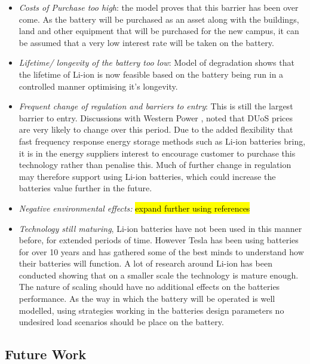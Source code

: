 \begin{itemize}
\tightlist
\item
  \emph{Costs of Purchase too high}: the model proves that this barrier
  has been over come. As the battery will be purchased as an asset along
  with the buildings, land and other equipment that will be purchased
  for the new campus, it can be assumed that a very low interest rate
  will be taken on the battery.
\item
  \emph{Lifetime/ longevity of the battery too low}: Model of
  degradation shows that the lifetime of Li-ion is now feasible based on
  the battery being run in a controlled manner optimising it's
  longevity.
\item
  \emph{Frequent change of regulation and barriers to entry}: This is
  still the largest barrier to entry. Discussions with Western Power
  \cite{wpMWMD}, noted that DUoS prices are very likely to change over
  this period. Due to the added flexibility that fast frequency response
  energy storage methods such as Li-ion batteries bring, it is in the
  energy suppliers interest to encourage customer to purchase this
  technology rather than penalise this. Much of further change in
  regulation may therefore support using Li-ion batteries, which could
  increase the batteries value further in the future.
\item
  \emph{Negative environmental effects:}
  \hl{expand further using references } \cite{daniels2013financial}
\item
  \emph{Technology still maturing}, Li-ion batteries have not been used
  in this manner before, for extended periods of time. However Tesla has
  been using batteries for over 10 years and has gathered some of the
  best minds to understand how their batteries will function. A lot of
  research around Li-ion has been conducted showing that on a smaller
  scale the technology is mature enough. The nature of scaling should
  have no additional effects on the batteries performance. As the way in
  which the battery will be operated is well modelled, using strategies
  working in the batteries design parameters no undesired load scenarios
  should be place on the battery.
\end{itemize}

\subsection{Future Work}\label{future-work}

